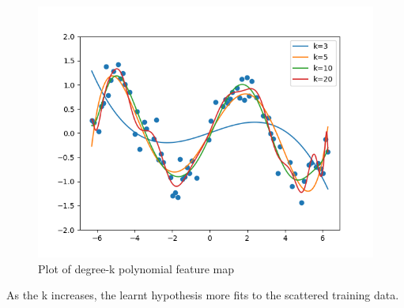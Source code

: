 \begin{answer}

    \begin{figure}[h]
        \centering
        \includegraphics[width=0.8\linewidth]{tex/featuremaps/plot_c.png}
        \caption{Plot of degree-k polynomial feature map}
        \label{fig:my_label}
    \end{figure}
    As the k increases, the learnt hypothesis more fits to the scattered training data. 
\end{answer}

